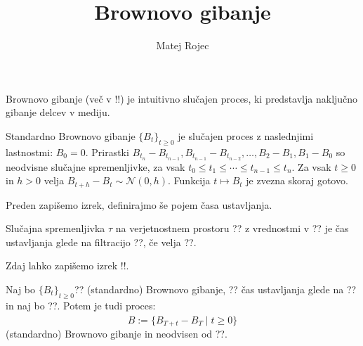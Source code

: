 \documentclass[11pt]{article}
\begin{document}
\title{Brownovo gibanje}
\author{Matej Rojec}
\date{}
\maketitle

Brownovo gibanje (več v !!) je intuitivno slučajen proces, %
ki predstavlja naključno gibanje delcev v mediju.
    

    Standardno Brownovo gibanje $\{B_t\}_{t \geq 0}$ je slučajen proces z naslednjimi lastnostmi: 
        $B_0 = 0$.
        Prirastki $B_{t_n} - B_{t_{n-1}}, B_{t_{n-1}} - B_{t_{n-2}}, \ldots, B_2 - B_1, B_1 - B_0$ so neodvisne slučajne spremenljivke, za vsak $t_0 \leq t_1 \leq \cdots \leq t_{n-1} \leq t_n$.
        Za vsak $t \geq 0$ in $h > 0$ velja $B_{t+h} - B_t \sim \mathcal{N}(0, h)$.
        Funkcija $t \mapsto B_t$ je zvezna skoraj gotovo.
    
    Preden zapišemo izrek, definirajmo še pojem časa ustavljanja.
    
    Slučajna spremenljivka $\tau$ na verjetnostnem prostoru ?? z vrednostmi v ??
    je čas ustavljanja glede na filtracijo ??, če velja ??.
    
    Zdaj lahko zapišemo izrek !!. %
    
    Naj bo $\{B_t\}_{t \geq 0}$?? (standardno) Brownovo gibanje, ?? čas ustavljanja glede na 
    ?? in naj bo ??.
    Potem je tudi proces:
    \[
    \hat{B} := \{B_{T+t} - B_T \mid t \geq 0\}
    \]
    (standardno) Brownovo gibanje in neodvisen od ??.
    
\end{document}
